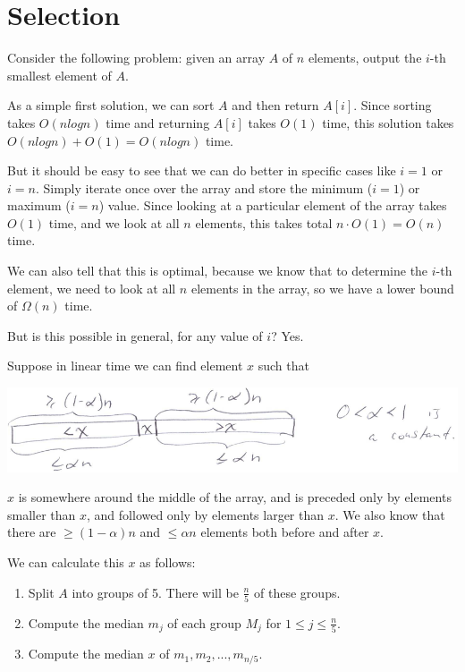 \chapter{Selection}

Consider the following problem: given an array $A$ of $n$ elements,
output the $i$-th smallest element of $A$.

As a simple first solution, we can sort $A$ and then return $A[i]$.
Since sorting takes $O(nlogn)$ time and returning $A[i]$ takes $O(1)$
time, this solution takes $O(nlogn) + O(1) = O(nlogn)$ time.

But it should be easy to see that we can do better in specific cases
like $i=1$ or $i=n$.  Simply iterate once over the array and store the
minimum ($i=1$) or maximum ($i=n$) value.  Since looking at a
particular element of the array takes $O(1)$ time, and we look at all
$n$ elements, this takes total $n \cdot O(1) = O(n)$ time.

We can also tell that this is optimal, because we know that to
determine the $i$-th element, we need to look at all $n$ elements in
the array, so we have a lower bound of $\Omega (n)$ time.

But is this possible in general, for any value of $i$?  Yes.

Suppose in linear time we can find element $x$ such that

{
  \includegraphics[scale=0.6]{selection}
  \label{fig:selection}
}

$x$ is somewhere around the middle of the array, and is preceded only
by elements smaller than $x$, and followed only by elements larger
than $x$.  We also know that there are $ \geq (1-\alpha)n $ and $ \leq
\alpha n $ elements both before and after $x$.

We can calculate this $x$ as follows:

\begin{enumerate}

\item Split $A$ into groups of 5.  There will be $\frac{n}{5}$ of
  these groups.
\item Compute the median $m_j$ of each group $M_j$ for $ 1 \leq j \leq
  \frac{n}{5} $.
\item Compute the median $x$ of $m_1,m_2,...,m_{n/5}$.

\end{enumerate}

